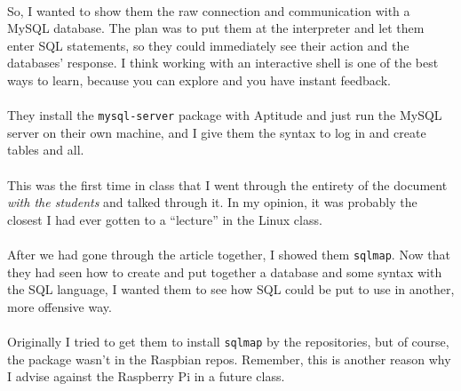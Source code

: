\documentclass[11pt]{article}
\begin{document}
	\paragraph{} So, I wanted to show them the raw connection and communication with a MySQL database. The plan was to put them at the interpreter and let them enter SQL statements, so they could immediately see their action and the databases' response. I think working with an interactive shell is one of the best ways to learn, because you can explore and you have instant feedback.

	\paragraph{} They install the \texttt{mysql-server} package with Aptitude and just run the MySQL server on their own machine, and I give them the syntax to log in and create tables and all.

	\begin{center}
		\graphicspath{ {.} }
		\centering
	\end{center}


	\paragraph{} This was the first time in class that I went through the entirety of the document \textit{with the students} and talked through it. In my opinion, it was probably the closest I had ever gotten to a ``lecture'' in the Linux class.

	\paragraph{} After we had gone through the article together, I showed them \texttt{sqlmap}. Now that they had seen how to create and put together a database and some syntax with the SQL language, I wanted them to see how SQL could be put to use in another, more offensive way.

	\paragraph{} Originally I tried to get them to install \texttt{sqlmap} by the repositories, but of course, the package wasn't in the Raspbian repos. Remember, this is another reason why I advise against the Raspberry Pi in a future class.
\end{document}
